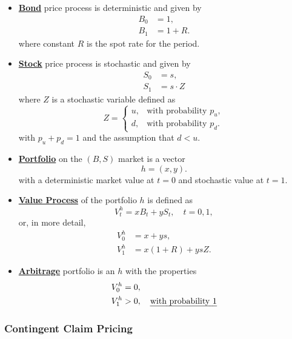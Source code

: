 \documentclass[twocolumn,landscape,10pt]{article}
\theoremstyle{definition}
\begin{document}
\begin{itemize}
    \item 
        \textbf{\underline{Bond}} price process is deterministic and given by
        \begin{align*}
            B_0 & = 1, \\
            B_1 & = 1 + R.
        \end{align*}
        where constant $R$ is the spot rate for the period.
    \item
        \textbf{\underline{Stock}} price process is stochastic and given by
        \begin{align*}
            S_0 & = s, \\
            S_1 & = s\cdot Z
        \end{align*}
        where $Z$ is a stochastic variable defined as
        \[
            Z =
            \begin{cases}
                u, & \text{with probability $p_u$}, \\
                d, & \text{with probability $p_d$}.
            \end{cases}
        \]
        with $p_u+p_d=1$ and the assumption that $d<u$.
    \item
        \textbf{\underline{Portfolio}} on the $(B, S)$ market is a vector
        \[
            h = (x, y).
        \]
        with a deterministic market value at $t=0$ and stochastic value at
        $t=1$.
    \item \textbf{\underline{Value Process}} of the portfolio $h$ is defined as
        \[
            V_t^h = xB_t+yS_t,\quad t=0,1,
        \]
        or, in more detail,
        \begin{align*}
            V_0^h & = x+ys, \\
            V_1^h & = x(1+R)+ysZ.
        \end{align*}
    \item \textbf{\underline{Arbitrage}} portfolio is an $h$ with the properties
        \begin{align*}
            V_0^h & = 0, \\
            V_1^h & > 0, \quad\text{\emph{with probability 1}}
        \end{align*}
\end{itemize}

\subsubsection{Contingent Claim Pricing}
\end{document}
